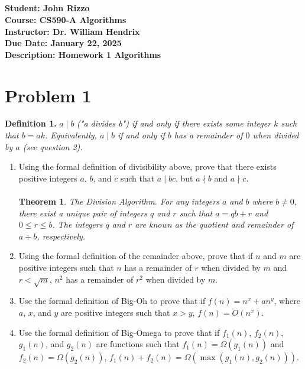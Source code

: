 \documentclass[12pt, letterpaper]{article}
\title{\classname \\ \assignmentdescription}
\author{\studentname}
\date{\duedate}
\newcommand{\studentname}          {John Rizzo           }
\newcommand{\classname}            {CS590-A Algorithms   }
\newcommand{\professorname}        {Dr. William Hendrix  }
\newcommand{\assignmentdescription}{Homework 1 Algorithms}
\newcommand{\duedate}              {January 22, 2025     }
\begin{document}

\noindent
\normalsize \textbf{Student:     \studentname} \\ [5pt]
            \textbf{Course:      \classname} \\ [5pt]
            \textbf{Instructor:  \professorname} \\ [5pt]
            \textbf{Due Date:    \duedate} \\ [5pt]
            \textbf{Description: \assignmentdescription}

\vspace{0.5cm}

\section*{Problem 1}
\textbf{Definition 1.} $a \mid b$ \textit{("a divides b") if and only if there exists some 
integer $k$ such that $b = ak$. Equivalently, $a \mid b$ if and only if $b$ has a 
remainder of $0$ when divided by $a$ (see question 2).}

\begin{enumerate}
    \item Using the formal definition of divisibility above, prove that there exists positive integers $a$, $b$, and $c$ such that $a \mid bc$, but $a \nmid b$ and $a \nmid c$. \\ \\ \textbf{Theorem 1}. \textit{The Division Algorithm. For any integers $a$ and $b$ where $b \neq 0$, there exist a unique pair of integers $q$ and $r$ such that $a = qb + r$ and $0 \leq r \leq b$.  The integers $q$ and $r$ are known as the quotient and remainder of $a \div b$, respectively.}

    \item Using the formal definition of the remainder above, prove that if $n$ and $m$ are positive integers such that $n$ has a remainder of $r$ when divided by $m$ and $r < \sqrt{m}$, $n^2$ has a remainder of $r^2$ when divided by $m$.

    \item Use the formal definition of Big-Oh to prove that if $f(n) = n^x + an^y$, where $a$, $x$, and $y$ are positive integers such that $x > y$, $f(n) = O(n^x)$.

    \item Use the formal definition of Big-Omega to prove that if $f_1(n)$, $f_2(n)$, $g_1(n)$, and $g_2(n)$ are functions such that $f_1(n) = \Omega(g_1(n))$ and $f_2(n) = \Omega(g_2(n))$, $f_1(n) + f_2(n) = \Omega(\max(g_1(n), g_2(n)))$.
\end{enumerate}
\end{document}
